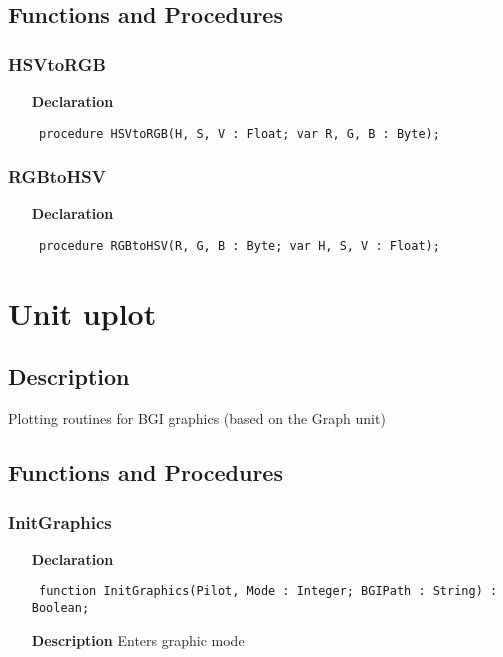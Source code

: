 \documentclass[12pt,a4paper,oneside]{report}
\newcommand{\declarationitem}[1]{\textbf{#1}}
\newcommand{\descriptiontitle}[1]{\textbf{#1}}
\newcommand{\code}[1]{\texttt{#1}}
\begin{document}
\subsection{Functions and Procedures}
\subsubsection{HSVtoRGB}
\label{uhsvrgb-HSVtoRGB}
\begin{itemize}\item[\declarationitem{Declaration}\hfill]
	\begin{flushleft}
		\code{
			procedure HSVtoRGB(H, S, V : Float; var R, G, B : Byte);}
		
	\end{flushleft}
	
\end{itemize}
\subsubsection{RGBtoHSV}
\label{uhsvrgb-RGBtoHSV}
\begin{itemize}\item[\declarationitem{Declaration}\hfill]
	\begin{flushleft}
		\code{
			procedure RGBtoHSV(R, G, B : Byte; var H, S, V : Float);}
		
	\end{flushleft}
	
\end{itemize}
\section{Unit uplot}
\label{uplot}
\subsection{Description}
Plotting routines for BGI graphics (based on the Graph unit) 
\subsection{Functions and Procedures}
\subsubsection{InitGraphics}
\label{uplot-InitGraphics}
\begin{itemize}\item[\declarationitem{Declaration}\hfill]
	\begin{flushleft}
		\code{
			function InitGraphics(Pilot, Mode : Integer; BGIPath : String) : Boolean;}
		
	\end{flushleft}
	
	\par
	\item[\descriptiontitle{Description}]
	Enters graphic mode
\end{itemize}
\end{document}
